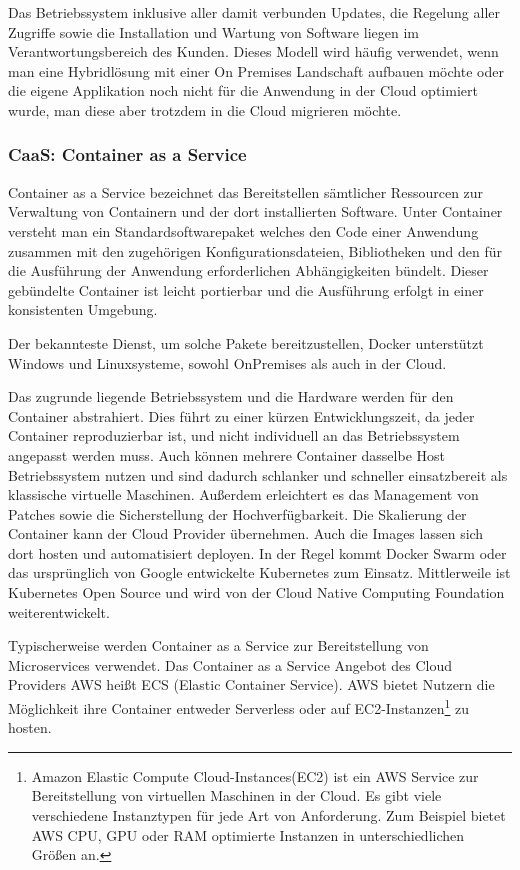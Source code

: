    Das Betriebssystem inklusive aller damit verbunden Updates, die Regelung aller Zugriffe sowie die Installation und Wartung von Software liegen im Verantwortungsbereich des Kunden.
   Dieses Modell wird häufig verwendet, wenn man eine Hybridlösung mit einer On Premises Landschaft aufbauen möchte oder die eigene Applikation noch nicht für die Anwendung in der Cloud optimiert wurde, man diese aber trotzdem in die Cloud migrieren möchte.\cite[]{CloudComputingDef}

   \subsubsection{CaaS: Container as a Service}
   Container as a Service bezeichnet das Bereitstellen sämtlicher Ressourcen zur Verwaltung von Containern und der dort installierten Software.
   Unter Container versteht man ein {}\glqq Standardsoftwarepaket\grqq{} welches {}\glqq den Code einer Anwendung zusammen mit den zugehörigen Konfigurationsdateien,
   Bibliotheken und den für die Ausführung der Anwendung erforderlichen Abhängigkeiten\grqq{} bündelt. \cite[]{CaaS}
   Dieser gebündelte Container ist leicht portierbar und die Ausführung erfolgt in einer konsistenten Umgebung.

   Der bekannteste Dienst, um solche Pakete bereitzustellen, Docker unterstützt Windows und Linuxsysteme, sowohl OnPremises als auch in der Cloud.

   Das zugrunde liegende Betriebssystem und die Hardware werden für den Container abstrahiert.
   Dies führt zu einer kürzen Entwicklungszeit, da jeder Container reproduzierbar ist, und nicht individuell an das Betriebssystem angepasst werden muss.
   Auch können mehrere Container dasselbe Host Betriebssystem nutzen und sind dadurch schlanker und schneller einsatzbereit als klassische virtuelle Maschinen.
   Außerdem erleichtert es das Management von Patches sowie die Sicherstellung der Hochverfügbarkeit.
   Die Skalierung der Container kann der Cloud Provider übernehmen. Auch die Images lassen sich dort hosten und automatisiert deployen.
   In der Regel kommt Docker Swarm oder das ursprünglich von Google entwickelte Kubernetes zum Einsatz.
   Mittlerweile ist Kubernetes Open Source und wird von der Cloud Native Computing Foundation weiterentwickelt.

   Typischerweise werden Container as a Service zur Bereitstellung von Microservices verwendet.
   Das Container as a Service Angebot des Cloud Providers AWS heißt ECS (Elastic Container Service).
   AWS bietet Nutzern die Möglichkeit ihre Container entweder Serverless oder auf EC2-Instanzen\footnote{Amazon Elastic Compute Cloud-Instances(EC2) ist ein AWS Service
   zur Bereitstellung von virtuellen Maschinen in der Cloud. Es gibt viele verschiedene Instanztypen für jede Art von Anforderung.
   Zum Beispiel bietet AWS CPU, GPU oder RAM optimierte Instanzen in unterschiedlichen Größen an. } zu hosten. \cite[]{AWSECS}

